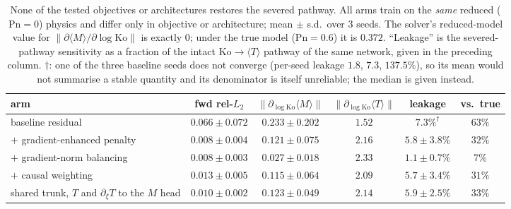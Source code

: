 \begin{table}[h]\centering\footnotesize
\setlength{\tabcolsep}{4pt}
\caption{None of the tested objectives or architectures restores the severed pathway. All arms train on the \emph{same} reduced ($\mathrm{Pn}{=}0$) physics and differ only in objective or architecture; mean $\pm$ s.d.\ over 3 seeds. The solver's reduced-model value for $\|\partial\langle M\rangle/\partial\log\mathrm{Ko}\|$ is exactly $0$; under the true model ($\mathrm{Pn}{=}0.6$) it is $0.372$. ``Leakage'' is the severed-pathway sensitivity as a fraction of the intact $\mathrm{Ko}\!\to\!\langle T\rangle$ pathway of the same network, given in the preceding column. $\dagger$: one of the three baseline seeds does not converge (per-seed leakage $1.8$, $7.3$, $137.5\%$), so its mean would not summarise a stable quantity and its denominator is itself unreliable; the median is given instead.}
\label{tab:e1}
\begin{tabular}{lccccc}\toprule
arm & fwd rel-$L_2$ & $\|\partial_{\log\mathrm{Ko}}\langle M\rangle\|$ & $\|\partial_{\log\mathrm{Ko}}\langle T\rangle\|$ & leakage & vs.\ true\\\midrule
baseline residual & $0.066\pm0.072$ & $0.233\pm0.202$ & $1.52$ & $7.3\%^\dagger$ & $63\%$\\
$+$ gradient-enhanced penalty & $0.008\pm0.004$ & $0.121\pm0.075$ & $2.16$ & $5.8\pm3.8\%$ & $32\%$\\
$+$ gradient-norm balancing & $0.008\pm0.003$ & $0.027\pm0.018$ & $2.33$ & $1.1\pm0.7\%$ & $7\%$\\
$+$ causal weighting & $0.013\pm0.005$ & $0.115\pm0.064$ & $2.09$ & $5.7\pm3.4\%$ & $31\%$\\
shared trunk, $T$ and $\partial_\xi T$ to the $M$ head & $0.010\pm0.002$ & $0.123\pm0.049$ & $2.14$ & $5.9\pm2.5\%$ & $33\%$\\
\bottomrule\end{tabular}
\end{table}

